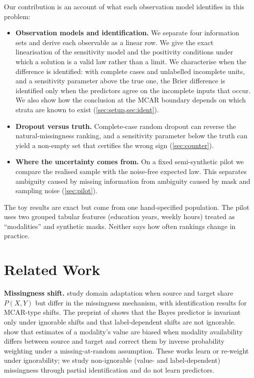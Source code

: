 \documentclass{article}
\theoremstyle{plain}
\theoremstyle{definition}
\theoremstyle{remark}
\begin{document}
Our contribution is an account of what each observation model identifies in
this problem:
\begin{itemize}
\item \textbf{Observation models and identification.} We separate four
information sets and derive each observable as a linear row. We give the
exact linearisation of the sensitivity model and the positivity conditions
under which a solution is a valid law rather than a limit. We characterise
when the difference is identified: with complete cases and unlabelled
incomplete units, and a sensitivity parameter above the true one, the Brier
difference is identified only when the predictors agree on the incomplete
inputs that occur. We also show how the conclusion at the MCAR
boundary depends on which strata are known to exist (\cref{sec:setup,sec:ident}).
\item \textbf{Dropout versus truth.} Complete-case random dropout can reverse
the natural-missingness ranking, and a sensitivity parameter below the truth
can yield a non-empty set that certifies the wrong sign (\cref{sec:counter}).
\item \textbf{Where the uncertainty comes from.} On a fixed semi-synthetic
pilot we compare the realised sample with the noise-free expected law. This
separates ambiguity caused by missing information from ambiguity caused by
mask and sampling noise (\cref{sec:pilot}).
\end{itemize}
The toy results are exact but come from one hand-specified population. The
pilot uses two grouped tabular features (education years, weekly hours)
treated as ``modalities'' and synthetic masks. Neither says how often
rankings change in practice.

\section{Related Work}
\label{sec:related}

\textbf{Missingness shift.} \citet{zhou2023domain} study domain adaptation
when source and target share $P(X,Y)$ but differ in the missingness
mechanism, with identification results for MCAR-type shifts. The preprint of
\citet{rockenschaub2024robust} shows that the Bayes predictor is invariant
only under ignorable shifts and that label-dependent shifts are not
ignorable. \citet{choi2026icym2i} show that estimates of a modality's value
are biased when modality availability differs between source and target and
correct them by inverse probability weighting under a missing-at-random
assumption. These works learn or re-weight under ignorability; we study
non-ignorable (value- and label-dependent) missingness through partial
identification and do not learn predictors.
\end{document}
